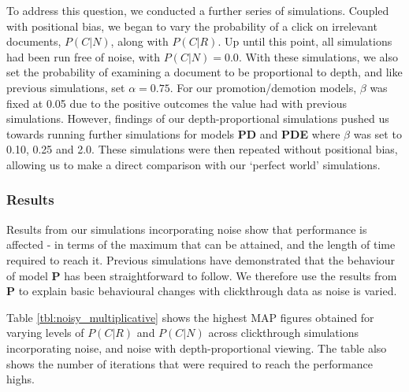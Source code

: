 To address this question, we conducted a further series of simulations. Coupled with positional bias, we began to vary the probability of a click on irrelevant documents, $P(C|N)$, along with $P(C|R)$. Up until this point, all simulations had been run free of noise, with $P(C|N) = 0.0$. With these simulations, we also set the probability of examining a document to be proportional to depth, and like previous simulations, set $\alpha = 0.75$. For our promotion/demotion models, $\beta$ was fixed at 0.05 due to the positive outcomes the value had with previous simulations. However, findings of our depth-proportional simulations pushed us towards running further simulations for models \textbf{PD} and \textbf{PDE} where $\beta$ was set to 0.10, 0.25 and 2.0. These simulations were then repeated without positional bias, allowing us to make a direct comparison with our `perfect world' simulations.

\subsubsection{Results}\label{sec:results:noise}
Results from our simulations incorporating noise show that performance is affected - in terms of the maximum that can be attained, and the length of time required to reach it. Previous simulations have demonstrated that the behaviour of model \textbf{P} has been straightforward to follow. We therefore use the results from \textbf{P} to explain basic behavioural changes with clickthrough data as noise is varied.

Table \ref{tbl:noisy_multiplicative} shows the highest MAP figures obtained for varying levels of $P(C|R)$ and $P(C|N)$ across clickthrough simulations incorporating noise, and noise with depth-proportional viewing. The table also shows the number of iterations that were required to reach the performance highs.

